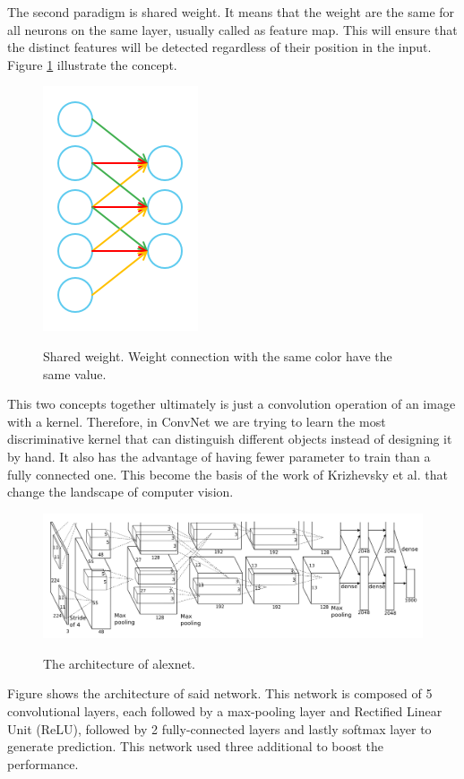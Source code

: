 \documentclass[a4paper,11pt]{kth-mag}
\begin{document}
The second paradigm is shared weight. It means that the weight are the same for all neurons on the same layer, usually called as feature map. This will ensure that the distinct features will be detected regardless of their position in the input. Figure \ref{fig:shared} illustrate the concept.

\begin{figure}
\centering
\includegraphics[scale=0.5]{image/shared.png}
\label{fig:shared}
\caption{Shared weight. Weight connection with the same color have the same value.}
\end{figure}

This two concepts together ultimately is just a convolution operation of an image with a kernel. Therefore, in ConvNet we are trying to learn the most discriminative kernel that can distinguish different objects instead of designing it by hand. It also has the advantage of having fewer parameter to train than a fully connected one.
This become the basis of the work of Krizhevsky et al. that change the landscape of computer vision.

\begin{figure}
\centering
\includegraphics[scale=0.35]{image/alexnet.png}
\label{fig:alexnet}
\caption{The architecture of alexnet.}
\end{figure}

Figure \label{fig:alexnet} shows the architecture of said network. This network is composed of 5 convolutional layers, each followed by a max-pooling layer and Rectified Linear Unit (ReLU), followed by 2 fully-connected layers and lastly softmax layer to generate prediction. This network used three additional to boost the performance.
\end{document}
